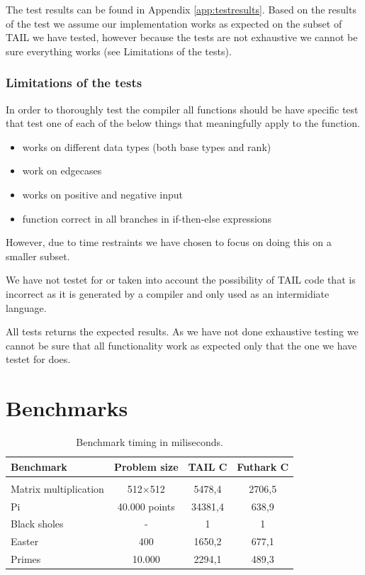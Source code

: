 \documentclass[11pt]{article}
\begin{document}
The test results can be found in Appendix \ref{app:testresults}. Based on the results of the test we assume our implementation works as expected on the subset of TAIL we have tested, however because the tests are not exhaustive we cannot be sure everything works (see Limitations of the tests).

\subsubsection{Limitations of the tests}
In order to thoroughly test the compiler all functions should be have specific test that test one of each of the below things
that meaningfully apply to the function. 
\begin{itemize}
\item works on different data types (both base types and rank)
\item work on edgecases
\item works on positive and negative input
\item function correct in all branches in if-then-else expressions
\end{itemize}
However, due to time restraints we have chosen to focus on doing this on a smaller subset. 

We have not testet for or taken into account the possibility of TAIL code that is incorrect as it is generated by a compiler and only used as an intermidiate language. 

All tests returns the expected results. 
As we have not done exhaustive testing we cannot be sure that all functionality work as expected only that the one we have testet for does. 

\section{Benchmarks}

\begin{table}[h]
\begin{center}
\label{tbl:benchmark}
\begin{tabular}{l c c c}
Benchmark & Problem size & TAIL C & Futhark C \\ \hline \\
Matrix multiplication    & 512$\times$512 &  5478,4     & 2706,5  \\
Pi		     	         & 40.000 points     &  34381,4   & 638,9 \\
Black sholes               & - 			    & 1               & 1 \\
Easter                         & 400 		    & 1650,2      & 677,1 \\
Primes                        & 10.000                & 2294,1      & 489,3 \\
\end{tabular}
\caption{Benchmark timing in miliseconds.}
\label{sec:benchmarks}
\end{center}
\end{table}
\end{document}
